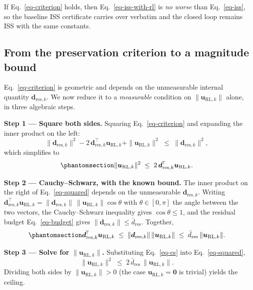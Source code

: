 \documentclass[
  11pt,
]{article}
\theoremstyle{plain}
\theoremstyle{plain}
\theoremstyle{definition}
\theoremstyle{remark}
\begin{document}
If Eq.~\ref{eq-criterion} holds, then Eq.~\ref{eq-iss-with-rl} is
\emph{no worse} than Eq.~\ref{eq-iss}, so the baseline ISS certificate
carries over verbatim and the closed loop remains ISS with the same
constants.

\subsection{From the preservation criterion to a magnitude
bound}\label{sec-magbound}

Eq.~\ref{eq-criterion} is geometric and depends on the unmeasurable
internal quantity \(\bm{d}_{\mathrm{res},k}\). We now reduce it to a
\emph{measurable} condition on \(\|\bm{u}_{\mathrm{RL},k}\|\) alone, in
three algebraic steps.

\textbf{Step 1 --- Square both sides.} Squaring Eq.~\ref{eq-criterion}
and expanding the inner product on the left: \[
\|\bm{d}_{\mathrm{res},k}\|^2
- 2\,\bm{d}_{\mathrm{res},k}^{\!\top}\bm{u}_{\mathrm{RL},k}
+ \|\bm{u}_{\mathrm{RL},k}\|^2
\;\le\;
\|\bm{d}_{\mathrm{res},k}\|^2,
\] which simplifies to
\begin{equation}\protect\phantomsection\label{eq-squared}{
\|\bm{u}_{\mathrm{RL},k}\|^2
\;\le\;
2\,\bm{d}_{\mathrm{res},k}^{\!\top}\bm{u}_{\mathrm{RL},k}.
}\end{equation}

\textbf{Step 2 --- Cauchy--Schwarz, with the known bound.} The inner
product on the right of Eq.~\ref{eq-squared} depends on the unmeasurable
\(\bm{d}_{\mathrm{res},k}\). Writing
\(\bm{d}_{\mathrm{res},k}^{\!\top}\bm{u}_{\mathrm{RL},k} =
\|\bm{d}_{\mathrm{res},k}\|\,\|\bm{u}_{\mathrm{RL},k}\|\cos\theta\) with
\(\theta \in [0,\pi]\) the angle between the two vectors, the
Cauchy--Schwarz inequality gives \(\cos\theta \le 1\), and the residual
budget Eq.~\ref{eq-budget} gives
\(\|\bm{d}_{\mathrm{res},k}\| \le \bar{d}_{\mathrm{res}}\). Together,
\begin{equation}\protect\phantomsection\label{eq-cs}{
\bm{d}_{\mathrm{res},k}^{\!\top}\bm{u}_{\mathrm{RL},k}
\;\le\;
\|\bm{d}_{\mathrm{res},k}\|\,\|\bm{u}_{\mathrm{RL},k}\|
\;\le\;
\bar{d}_{\mathrm{res}}\,\|\bm{u}_{\mathrm{RL},k}\|.
}\end{equation}

\textbf{Step 3 --- Solve for \(\|\bm{u}_{\mathrm{RL},k}\|\).}
Substituting Eq.~\ref{eq-cs} into Eq.~\ref{eq-squared}, \[
\|\bm{u}_{\mathrm{RL},k}\|^2
\;\le\;
2\,\bar{d}_{\mathrm{res}}\,\|\bm{u}_{\mathrm{RL},k}\|.
\] Dividing both sides by \(\|\bm{u}_{\mathrm{RL},k}\| > 0\) (the case
\(\bm{u}_{\mathrm{RL},k}=\bm{0}\) is trivial) yields the ceiling.
\end{document}
